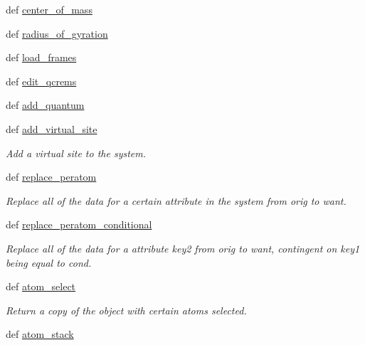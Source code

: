 \begin{DoxyCompactItemize}
\item 
def \hyperlink{classforcebalance_1_1molecule_1_1Molecule_a6aa22586a5590f63ea20e269e3f195a5}{center\-\_\-of\-\_\-mass}
\item 
def \hyperlink{classforcebalance_1_1molecule_1_1Molecule_a02ff6f6642ed47c3b1fa3bb00191c32a}{radius\-\_\-of\-\_\-gyration}
\item 
def \hyperlink{classforcebalance_1_1molecule_1_1Molecule_a68e276a95910d534fa2e937abbc60e1c}{load\-\_\-frames}
\item 
def \hyperlink{classforcebalance_1_1molecule_1_1Molecule_a441d8367806c9a802bd0693fea16c62a}{edit\-\_\-qcrems}
\item 
def \hyperlink{classforcebalance_1_1molecule_1_1Molecule_a33020ff5e5cec23a3d9d1fe7adfa8583}{add\-\_\-quantum}
\item 
def \hyperlink{classforcebalance_1_1molecule_1_1Molecule_a13d86eb62139bdc2a835756cacb3be66}{add\-\_\-virtual\-\_\-site}
\begin{DoxyCompactList}\small\item\em \-Add a virtual site to the system. \end{DoxyCompactList}\item 
def \hyperlink{classforcebalance_1_1molecule_1_1Molecule_ad825186bec1659fdad2521a1b377323b}{replace\-\_\-peratom}
\begin{DoxyCompactList}\small\item\em \-Replace all of the data for a certain attribute in the system from orig to want. \end{DoxyCompactList}\item 
def \hyperlink{classforcebalance_1_1molecule_1_1Molecule_ae565eb57c2ee21f2be19b9761754aba5}{replace\-\_\-peratom\-\_\-conditional}
\begin{DoxyCompactList}\small\item\em \-Replace all of the data for a attribute key2 from orig to want, contingent on key1 being equal to cond. \end{DoxyCompactList}\item 
def \hyperlink{classforcebalance_1_1molecule_1_1Molecule_a432affdec68562b5b19fd249124480c3}{atom\-\_\-select}
\begin{DoxyCompactList}\small\item\em \-Return a copy of the object with certain atoms selected. \end{DoxyCompactList}\item 
def \hyperlink{classforcebalance_1_1molecule_1_1Molecule_a63dd7bc0347cc3dec5e8fa0ebfd567ec}{atom\-\_\-stack}

\end{DoxyCompactItemize}
